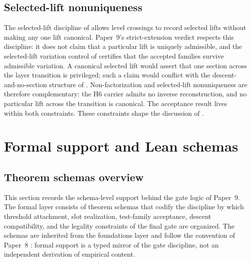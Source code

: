 \documentclass[11pt]{article}
\newcommand{\NewLayer}{H6}
\newcommand{\PaperNine}{Paper~9}
\newcommand{\PaperEight}{Paper~8}
\theoremstyle{definition}
\begin{document}
\subsection{Selected-lift nonuniqueness}\label{subsec:selected-lift-nonuniqueness-analysis}

The selected-lift discipline of \cite{Tsiokos2026FoundationsII} allows level
crossings to record selected lifts without making any one lift canonical.
\PaperNine{}'s strict-extension verdict respects this discipline: it does not
claim that a particular lift is uniquely admissible, and the selected-lift
variation control of  certifies
that the accepted families survive admissible variation.  A canonical selected
lift would assert that one section across the layer transition is privileged;
such a claim would conflict with the descent-and-no-section structure of
.
Non-factorization and selected-lift nonuniqueness are therefore complementary:
the \NewLayer{} carrier admits no inverse reconstruction, and no particular
lift across the transition is canonical.  The acceptance result lives within
both constraints.  These constraints shape the discussion of
.
 \section{Formal support and Lean schemas}\label{sec:formal-framework}

\subsection{Theorem schemas overview}\label{subsec:theorem-schemas-overview}

This section records the schema-level support behind the gate logic of
\PaperNine{}.  The formal layer consists of theorem schemas that codify the
discipline by which threshold attachment, slot realization, test-family
acceptance, descent compatibility, and the legality constraints of the final
gate are organized.  The schemas are inherited from the foundations layer
\cite{Tsiokos2026FoundationsII} and follow the convention of \PaperEight{}
\cite{Tsiokos2026CarrierToEvent}: formal support is a typed mirror of the gate
discipline, not an independent derivation of empirical content.
\end{document}
